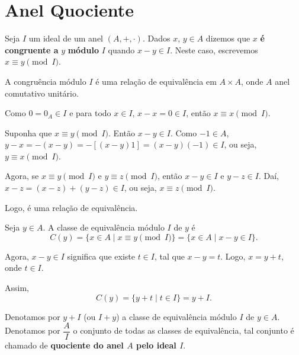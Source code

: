 \section{Anel Quociente} %
\label{sec:anel_quociente}

\begin{definicao}
    Seja $I$ um ideal de um anel $(A, +, \cdot)$. Dados $x$, $y \in A$ dizemos que $x$ \textbf{é congruente a} $y$ \textbf{m\'odulo} $I$ quando $x-y \in I$. Neste caso,
    escrevemos $x\equiv y \pmod I$.
\end{definicao}

\begin{proposicao}
    A congru{\^e}ncia m{\'o}dulo $I$ é uma relação de equival{\^e}ncia em $A \times A$, onde $A$ anel comutativo unitário.
\end{proposicao}
\begin{prova}
    Como $0 = 0_{A} \in I$ e para todo $x \in I$, $x - x = 0 \in I$, então $x \equiv x \pmod I$.

    Suponha que $x\equiv y \pmod I$. Então $x - y \in I$. Como $-1 \in A$, $y - x = -(x - y) = -[(x - y)1] = (x - y)(-1) \in I$, ou seja, $y\equiv x \pmod I$.

    Agora, se $x\equiv y \pmod I$ e $y\equiv z \pmod I$, então $x - y \in I$ e $y - z \in I$. Daí, $x - z = (x - z) + (y - z)\in I$, ou seja, $x\equiv z \pmod I$.

    Logo, é uma relação de equival{\^e}ncia.
\end{prova}

Seja $y \in A$. A classe de equival{\^e}ncia m{\'o}dulo $I$ de $y$ é
\[
    C(y) = \{x \in A \mid x\equiv y \pmod I\} = \{x \in A \mid x - y \in I\}.
\]

Agora, $x - y \in I$ significa que existe $t \in I$, tal que $x - y = t$. Logo, $x = y + t$, onde $t \in I$.

Assim,
\[
    C(y) = \{y + t\mid t \in I\} = y + I.
\]

\begin{observacao}
    Denotamos por $y + I$ (ou $I + y$) a classe de equival{\^e}ncia m{\'o}dulo $I$ de $y \in A$. Denotamos por $\dfrac{A}{I}$ o conjunto de todas as classes de equival{\^e}ncia,
    tal conjunto é chamado de \textbf{quociente do anel $A$ pelo ideal $I$}.
\end{observacao}

